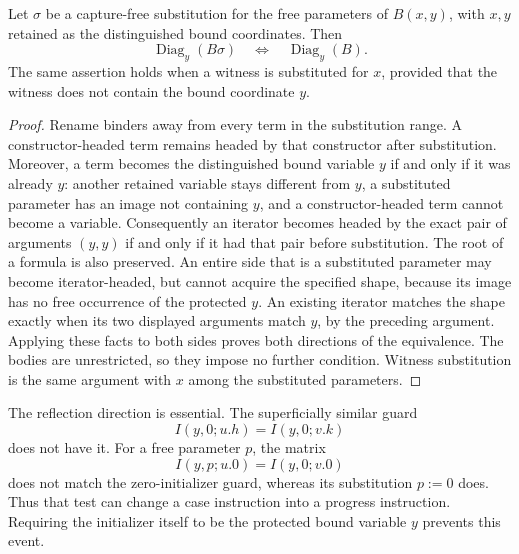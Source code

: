 \begin{lemma}
\label{lem:diag-stable}
Let $\sigma$ be a capture-free substitution for the free parameters of
$B(x,y)$, with $x,y$ retained as the distinguished bound coordinates.
Then
\[
 \operatorname{Diag}_y(B\sigma)
 \quad\Longleftrightarrow\quad
 \operatorname{Diag}_y(B).
\]
The same assertion holds when a witness is substituted for $x$, provided
that the witness does not contain the bound coordinate $y$.
\end{lemma}
\begin{proof}
Rename binders away from every term in the substitution range.
A constructor-headed term remains headed by that constructor after
substitution.  Moreover, a term becomes the distinguished bound variable
$y$ if and only if it was already $y$: another retained variable stays
different from $y$, a substituted parameter has an image not containing
$y$, and a constructor-headed term cannot become a variable.
Consequently an iterator becomes headed by the exact pair of arguments
$(y,y)$ if and only if it had that pair before substitution.
The root of a formula is also preserved.  An entire side that is a
substituted parameter may become iterator-headed, but cannot acquire the
specified shape, because its image has no free occurrence of the protected
$y$.  An existing iterator matches the shape exactly when its two displayed
arguments match $y$, by the preceding argument.  Applying these facts to
both sides proves both directions of the equivalence.  The bodies are
unrestricted, so they impose no further condition.  Witness substitution
is the same argument with $x$ among the substituted parameters.
\end{proof}

The reflection direction is essential.  The superficially similar guard
\[
 I(y,0;u.h)=I(y,0;v.k)
\]
does not have it.  For a free parameter $p$, the matrix
\[
 I(y,p;u.0)=I(y,0;v.0)
\]
does not match the zero-initializer guard, whereas its substitution
$p:=0$ does.  Thus that test can change a case instruction into a progress
instruction.  Requiring the initializer itself to be the protected bound
variable $y$ prevents this event.

